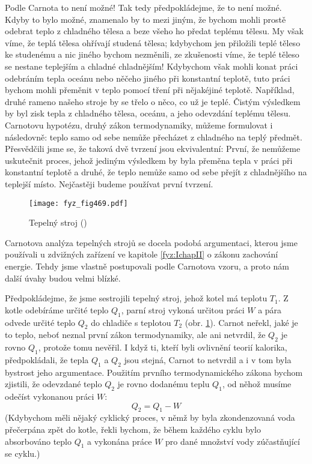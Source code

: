     Podle Carnota to není možné! Tak tedy předpokládejme, že to není možné. Kdyby to bylo možné,
    znamenalo by to mezi jiným, že bychom mohli prostě odebrat teplo z chladného tělesa a beze všeho
    ho předat teplému tělesu. My však víme, že teplá tělesa ohřívají studená tělesa; kdybychom jen
    přiložili teplé těleso ke studenému a nic jiného bychom nezměnili, ze zkušenosti víme, že teplé
    těleso se nestane teplejším a chladné chladnějším! Kdybychom však mohli konat práci odebráním
    tepla oceánu nebo něčeho jiného při konstantní teplotě, tuto práci bychom mohli přeměnit v teplo
    pomocí tření při nějakéjiné teplotě. Například, druhé rameno našeho stroje by se třelo o něco,
    co už je teplé. Čistým výsledkem by byl zisk tepla z chladného tělesa, oceánu, a jeho odevzdání
    teplému tělesu. Carnotovu hypotézu, druhý zákon termodynamiky, můžeme formulovat i následovně:
    teplo samo od sebe nemůže přecházet z chladného na teplý předmět. Přesvědčili jsme se, že taková
    dvě tvrzení jsou ekvivalentní: První, že nemůžeme uskutečnit proces, jehož jediným výsledkem by
    byla přeměna tepla v práci při konstantní teplotě a druhé, že teplo nemůže samo od sebe přejít z
    chladnějšího na teplejší místo. Nejčastěji budeme používat první tvrzení.

    \begin{figure}[ht!] %
      \centering
      \texttt{[image: fyz\_fig469.pdf]}
      \caption{Tepelný stroj (\cite[s.~707]{Feynman01})}
      \label{fyz:fig469}
    \end{figure}

    Carnotova analýza tepelných strojů se docela podobá argumentaci, kterou jsme používali u
    zdvižných zařízení ve kapitole \ref{fyz:IchapII} o zákonu zachování energie. Tehdy jsme vlastně
    postupovali podle Carnotova vzoru, a proto nám další úvahy budou velmi blízké.

    Předpokládejme, že jsme sestrojili tepelný stroj, jehož kotel má teplotu \(T_1\). Z kotle
    odebíráme určité teplo \(Q_1\), parní stroj vykoná určitou práci \(W\) a pára odvede určité
    teplo \(Q_2\) do chladiče s teplotou \(T_2\) (obr. \ref{fyz:fig469}). Carnot neřekl, jaké je to
    teplo, neboť neznal první zákon termodynamiky, ale ani netvrdil, že \(Q_2\) je rovno \(Q_1\),
    protože tomu nevěřil. I když ti, kteří byli ovlivnění teorií kalorika, předpokládali, že tepla
    \(Q_1\) a \(Q_2\) jsou stejná, Carnot to netvrdil a i v tom byla bystrost jeho argumentace.
    Použitím prvního termodynamického zákona bychom zjistili, že odevzdané teplo \(Q_2\) je rovno
    dodanému teplu \(Q_1\), od něhož musíme odečíst vykonanou práci \(W\):
    \begin{equation}\label{fyz:eq577}
      Q_2 = Q_1 - W
    \end{equation}
    (Kdybychom měli nějaký cyklický proces, v němž by byla zkondenzovaná voda přečerpána zpět do
    kotle, řekli bychom, že během každého cyklu bylo absorbováno teplo \(Q_1\) a vykonána práce
    \(W\) pro dané množství vody zúčastňující se cyklu.)

